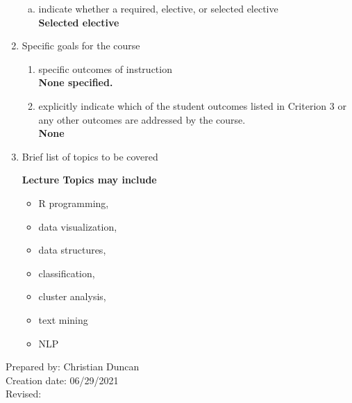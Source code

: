 \begin{enumerate}[1.]
\begin{enumerate}[a.]
\item indicate whether a required, elective, or selected elective\\ %
  {\bfseries
    Selected elective
  }

\end{enumerate}

\item Specific goals for the course
\begin{enumerate}
\item specific outcomes of instruction\\ %
  {\bfseries
    None specified.
  }

\item explicitly indicate which of the student outcomes listed in Criterion 3 or any other outcomes are addressed by the course.\\
  {\bfseries
    None
  }
\end{enumerate}

\item Brief list of topics to be covered\\
  {\bfseries
    Lecture Topics may include %
    \begin{itemize}
    \item R programming,
    \item data visualization,
    \item data structures,
    \item classification,
    \item cluster analysis,
    \item text mining
    \item NLP
    \end{itemize}
  }

\end{enumerate}

\noindent Prepared by: Christian Duncan\\
\noindent Creation date: 06/29/2021\\
\noindent Revised:\\
